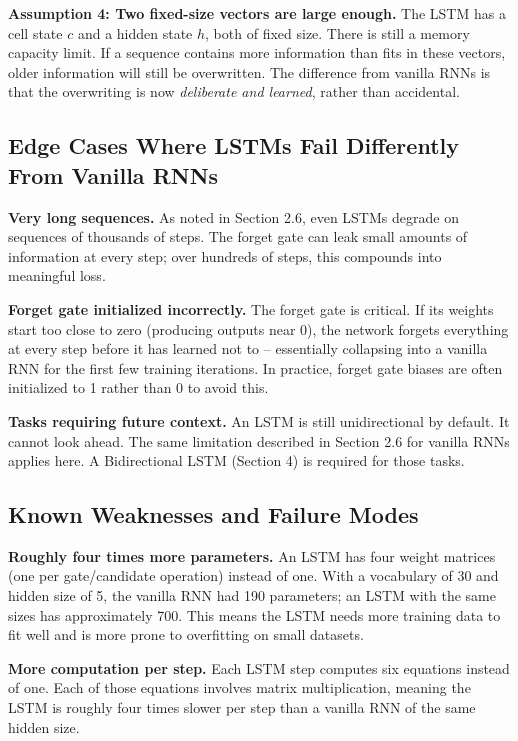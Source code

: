 \documentclass[12pt,a4paper]{article}
\begin{document}
\textbf{Assumption 4: Two fixed-size vectors are large enough.} The LSTM has a
cell state $c$ and a hidden state $h$, both of fixed size. There is still a memory
capacity limit. If a sequence contains more information than fits in these vectors,
older information will still be overwritten. The difference from vanilla RNNs is that
the overwriting is now \textit{deliberate and learned}, rather than accidental.

\subsection{Edge Cases Where LSTMs Fail Differently From Vanilla RNNs}

\textbf{Very long sequences.} As noted in Section 2.6, even LSTMs degrade on
sequences of thousands of steps. The forget gate can leak small amounts of
information at every step; over hundreds of steps, this compounds into meaningful
loss.

\textbf{Forget gate initialized incorrectly.} The forget gate is critical. If its
weights start too close to zero (producing outputs near 0), the network forgets
everything at every step before it has learned not to -- essentially collapsing into
a vanilla RNN for the first few training iterations. In practice, forget gate biases
are often initialized to 1 rather than 0 to avoid this.

\textbf{Tasks requiring future context.} An LSTM is still unidirectional by default.
It cannot look ahead. The same limitation described in Section 2.6 for vanilla RNNs
applies here. A Bidirectional LSTM (Section 4) is required for those tasks.

\subsection{Known Weaknesses and Failure Modes}

\textbf{Roughly four times more parameters.} An LSTM has four weight matrices
(one per gate/candidate operation) instead of one. With a vocabulary of 30 and hidden
size of 5, the vanilla RNN had 190 parameters; an LSTM with the same sizes has
approximately 700. This means the LSTM needs more training data to fit well
and is more prone to overfitting on small datasets.

\textbf{More computation per step.} Each LSTM step computes six equations instead
of one. Each of those equations involves matrix multiplication, meaning the LSTM is
roughly four times slower per step than a vanilla RNN of the same hidden size.
\end{document}
